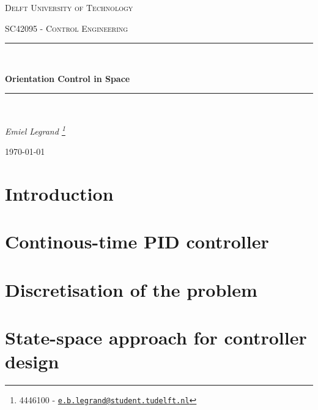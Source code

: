 \documentclass{article}
\date{\today}
\renewcommand*{\thefootnote}{\fnsymbol{footnote}}
\begin{document}
\begin{titlepage}
	\centering
	\vspace{2cm}
	{\scshape\large Delft University of Technology \par}
	\vspace{1cm}
	{\scshape\large SC42095 - Control Engineering\par}
	\vspace{3cm}
	\rule{\linewidth}{1.2pt}\\[0.5cm]
    {\huge\bfseries Orientation Control in Space\par}
	\vspace{0.5cm}
	\rule{\linewidth}{1.2pt}\\[0.5cm]
	\vspace{1.5cm}
	{\Large\itshape Emiel Legrand \footnote{4446100 -  \href{mailto:e.b.legrand@student.tudelft.nl}{\texttt{e.b.legrand@student.tudelft.nl}}} \par}
	\vfill

	{\large \today\par}
	\vfill
\end{titlepage}

\renewcommand*{\thefootnote}{\arabic{footnote}}
\setcounter{footnote}{0}

\clearpage
\renewcommand{\thepage}{\roman{page}}%

\setcounter{page}{1}
\tableofcontents
\clearpage

\renewcommand{\thepage}{\arabic{page}}%
\setcounter{page}{1}
\clearpage

\section{Introduction}

\clearpage

\section{Continous-time PID controller}

\clearpage

\section{Discretisation of the problem}

\clearpage

\section{State-space approach for controller design}

\clearpage
\end{document}
